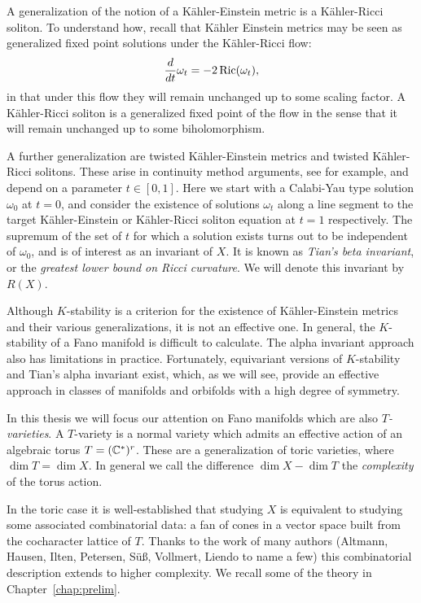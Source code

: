A generalization of the notion of a K\"ahler-Einstein metric is a K\"ahler-Ricci soliton. To understand how, recall that K\"ahler Einstein metrics may be seen as generalized fixed point solutions under the K\"ahler-Ricci flow:
\[
\frac{d}{dt} \omega_t = -2 \mathop{\rm Ric}\nolimits(\omega_t),
\]
in that under this flow they will remain unchanged up to some scaling factor. A K\"ahler-Ricci soliton is a generalized fixed point of the flow in the sense that it will remain unchanged up to some biholomorphism.

A further generalization are twisted K\"ahler-Einstein metrics and twisted K\"ahler-Ricci solitons. These arise in continuity method arguments, see \cite{datar2016kahler} for example, and depend on a parameter \(t \in [0,1]\). Here we start with a Calabi-Yau type solution \(\omega_0\) at \(t=0\), and consider the existence of solutions \(\omega_t\) along a line segment to the target K\"ahler-Einstein or K\"ahler-Ricci soliton equation at \(t= 1\) respectively. The supremum of the set of \(t\) for which a solution exists turns out to be independent of \(\omega_0\), and is of interest as an invariant of \(X\). It is known as \textit{Tian's beta invariant}, or the \textit{greatest lower bound on Ricci curvature}. We will denote this invariant by \(R(X)\).

Although \(K\)-stability is a criterion for the existence of K\"ahler-Einstein metrics and their various generalizations, it is not an effective one. In general, the \(K\)-stability of a Fano manifold is difficult to calculate. The alpha invariant approach also has limitations in practice. Fortunately, equivariant versions of \(K\)-stability and Tian's alpha invariant exist, which, as we will see, provide an effective approach in classes of manifolds and orbifolds with a high degree of symmetry.

In this thesis we will focus our attention on Fano manifolds which are also \textit{\(T\)-varieties}. A \(T\)-variety is a normal variety which admits an effective action of an algebraic torus \(T = (\mathbb{C}^*)^r\). These are a generalization of toric varieties, where \(\dim T = \dim X\). In general we call the difference \(\dim X - \dim T\) the \textit{complexity} of the torus action.

In the toric case it is well-established that studying \(X\) is equivalent to studying some associated combinatorial data: a fan of cones in a vector space built from the cocharacter lattice of \(T\). Thanks to the work of many authors (Altmann, Hausen, Ilten, Petersen, S\"u\ss, Vollmert, Liendo to name a few) this combinatorial description extends to higher complexity. We recall some of the theory in Chapter~\ref{chap:prelim}.

